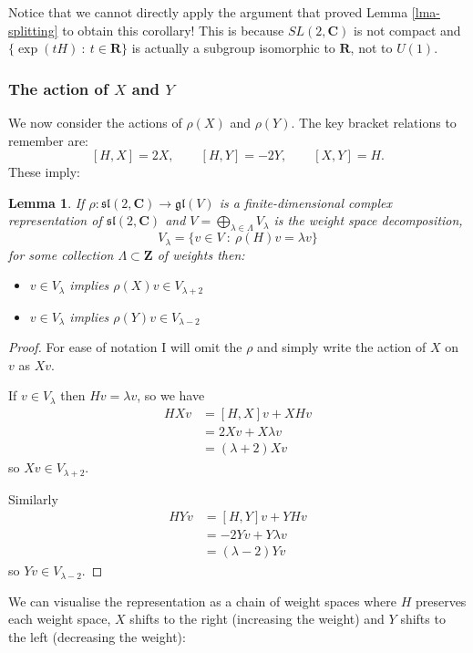\documentclass[12pt]{article}
\newcommand{\CC}{\mathbf{C}}
\newcommand{\RR}{\mathbf{R}}
\newcommand{\ZZ}{\mathbf{Z}}
\newtheorem{lma}[thm]{Lemma}
\theoremstyle{definition}
\theoremstyle{check}
\theoremstyle{remark}
\theoremstyle{TheoremNum}
\begin{document}
Notice that we cannot directly apply the argument that proved Lemma \ref{lma-splitting} to obtain this corollary! This is because $SL(2,\CC)$ is not compact and $\{\exp(tH)\ :\ t\in\RR\}$ is actually a subgroup isomorphic to $\RR$, not to $U(1)$.

\subsubsection{The action of $X$ and $Y$}

We now consider the actions of $\rho(X)$ and $\rho(Y)$. The key bracket relations to remember are:
\[[H,X]=2X,\qquad [H,Y]=-2Y,\qquad [X,Y]=H.\]
These imply:
\begin{lma}
If $\rho\colon\mathfrak{sl}(2,\CC)\to\mathfrak{gl}(V)$ is a finite-dimensional complex representation of $\mathfrak{sl}(2,\CC)$ and $V=\bigoplus_{\lambda\in\Lambda}V_{\lambda}$ is the weight space decomposition,
\[V_{\lambda}=\{v\in V\ :\ \rho(H)v=\lambda v\}\]
for some collection $\Lambda\subset\ZZ$ of weights then:
\begin{itemize}
\item $v\in V_{\lambda}$ implies $\rho(X)v\in V_{\lambda+2}$
\item $v\in V_{\lambda}$ implies $\rho(Y)v\in V_{\lambda-2}$
\end{itemize}
\end{lma}
\begin{proof}
For ease of notation I will omit the $\rho$ and simply write the action of $X$ on $v$ as $Xv$.

If $v\in V_{\lambda}$ then $Hv=\lambda v$, so we have
\begin{align*}
HXv&=[H,X]v+XHv\\
&=2Xv+X\lambda v\\
&=(\lambda+2)Xv
\end{align*}
so $Xv\in V_{\lambda+2}$.

Similarly
\begin{align*}
HYv&=[H,Y]v+YHv\\
&=-2Yv+Y\lambda v\\
&=(\lambda-2)Yv
\end{align*}
so $Yv\in V_{\lambda-2}$.
\end{proof}

We can visualise the representation as a chain of weight spaces where $H$ preserves each weight space, $X$ shifts to the right (increasing the weight) and $Y$ shifts to the left (decreasing the weight):

\sltwo
\end{document}
